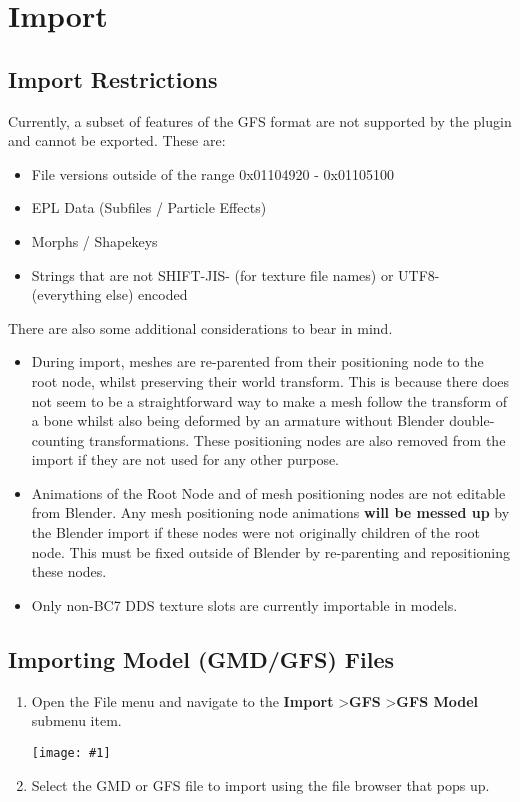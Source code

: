 \documentclass{article}
\newenvironment{guide}[1]
{
	\begin{center}
		\begin{tcolorbox}[%
			colback=black!20, 
			boxrule=0pt, 
			title=Step-by-step: #1,
			enhanced,
			breakable,
			overlay unbroken={%
                \draw[line width=1pt, black, rounded corners]
        	    (frame.north west) rectangle (frame.south east);
			},
    		overlay first={%
        		 \draw[line width=1pt, black, rounded corners]
        	    (frame.south west) -- (frame.north west) -- (frame.north east) -- (frame.south east);
                \draw[line width=1pt, black]
                (frame.south west) -- (frame.south east);
            },
    		overlay middle={%
                \draw[line width=1pt, black]
        	    (frame.north west) rectangle (frame.south east);
        	},
    		overlay last={%
                \draw[line width=1pt, black, rounded corners]
        	    (frame.north west) -- (frame.south west) -- (frame.south east) -- (frame.north east);
                \draw[line width=1pt, black]
                (frame.north west) -- (frame.north east);
           	}
        ]{}
    	\begin{enumerate}
}
{
    		\end{enumerate}
    	\end{tcolorbox}
	\end{center}  	 
}
\newcommand{\guideimage}[1]
{
	\begin{center}
		\texttt{[image: \#1]}
	\end{center}
}
\begin{document}
\section{Import}
\subsection{Import Restrictions}
Currently, a subset of features of the GFS format are not supported by the plugin and cannot be exported. These are:
\begin{itemize}
\item File versions outside of the range 0x01104920 - 0x01105100
\item EPL Data (Subfiles / Particle Effects)
\item Morphs / Shapekeys
\item Strings that are not SHIFT-JIS- (for texture file names) or UTF8- (everything else) encoded
\end{itemize}

There are also some additional considerations to bear in mind.
\begin{itemize}
\item During import, meshes are re-parented from their positioning node to the root node, whilst preserving their world transform. This is because there does not seem to be a straightforward way to make a mesh follow the transform of a bone whilst also being deformed by an armature without Blender double-counting transformations. These positioning nodes are also removed from the import if they are not used for any other purpose.
\item Animations of the Root Node and of mesh positioning nodes are not editable from Blender. Any mesh positioning node animations \textbf{will be messed up} by the Blender import if these nodes were not originally children of the root node. This must be fixed outside of Blender by re-parenting and repositioning these nodes.
\item Only non-BC7 DDS texture slots are currently importable in models.
\end{itemize}

\clearpage 
\subsection{Importing Model (GMD/GFS) Files}
\begin{guide}{Accessing the Model Import Menu}
\item Open the File menu and navigate to the \textbf{Import} \textgreater\space \textbf{GFS} \textgreater\space \textbf{GFS Model} submenu item.
\guideimage{images/import/import_gmd.png}
\item Select the GMD or GFS file to import using the file browser that pops up.
\end{guide}
\end{document}
